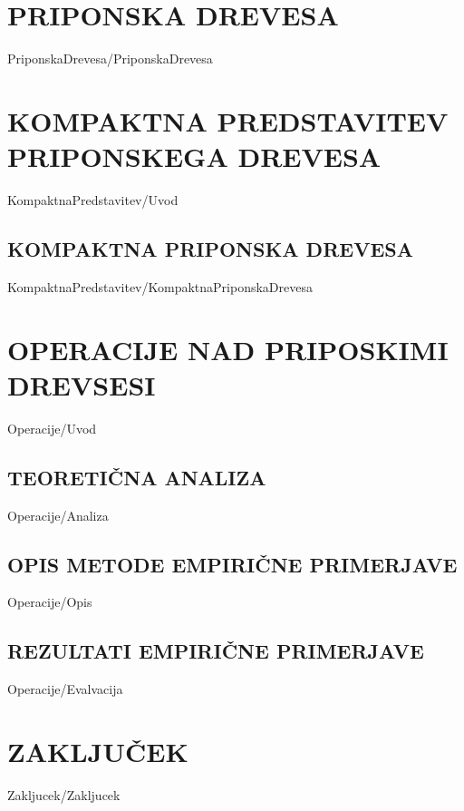 \documentclass[12pt,a4paper,titlepage,openany,twoside]{report}
\begin{document}
\chapter{PRIPONSKA DREVESA}\label{sec:priponska_drevesa}
\thispagestyle{fancy} 
{PriponskaDrevesa/PriponskaDrevesa}

\chapter{KOMPAKTNA PREDSTAVITEV PRIPONSKEGA DREVESA}\label{sec:Kompaktna}
\thispagestyle{fancy} 


{KompaktnaPredstavitev/Uvod}


\section{KOMPAKTNA PRIPONSKA DREVESA}\label{sec:CST}
{KompaktnaPredstavitev/KompaktnaPriponskaDrevesa}

\chapter{OPERACIJE NAD PRIPOSKIMI DREVSESI}\label{sec:OPeracije}
\thispagestyle{fancy} 
{Operacije/Uvod}



\section{TEORETIČNA ANALIZA}\label{sec:analiza}
{Operacije/Analiza}

\section{OPIS METODE EMPIRIČNE PRIMERJAVE}\label{sec:opis}
{Operacije/Opis}


\section{REZULTATI EMPIRIČNE PRIMERJAVE}\label{sec:primerjava}
{Operacije/Evalvacija}

\chapter{ZAKLJUČEK}\label{sec:zakljucek}
\thispagestyle{fancy} 
{Zakljucek/Zakljucek}
\end{document}
